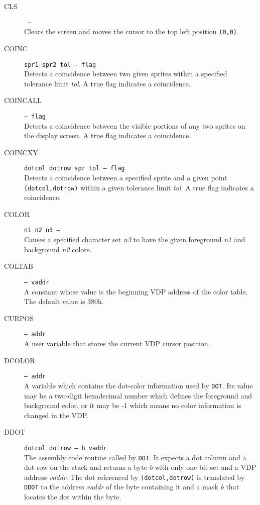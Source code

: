 \documentclass{article}
\begin{document}
\begin{multicols}{2}[]
\begin{description}
			\item[CLS]\texttt{ --- }\\
				Clears the screen and moves the cursor to the top left position \verb|(0,0)|.

			\item[COINC]\texttt{spr1 spr2 tol --- flag }\\
				Detects a coincidence between two given sprites within a specified
				tolerance limit \textit{tol}. A true flag indicates a coincidence.

			\item[COINCALL]\texttt{--- flag }\\
				Detects a coincidence between the visible portions of any two sprites
				on the display screen. A true flag indicates a coincidence.

			\item[COINCXY]\texttt{dotcol dotrow spr tol --- flag }\\
				Detects a coincidence between a specified sprite and a given point
				\verb|(dotcol,dotrow)| within a given tolerance limit \textit{tol}.
				A true flag indicates a coincidence.

			\item[COLOR]\texttt{n1 n2 n3 --- }\\
				Causes a specified character set \textit{n3} to have the given
				foreground \textit{n1} and background \textit{n2} colors.

			\item[COLTAB]\texttt{--- vaddr }\\
				A constant whose value is the beginning VDP address of the color
				table. The default value is 380h.

			\item[CURPOS]\texttt{--- addr }\\
				A user variable that stores the current VDP cursor position.

			\item[DCOLOR]\texttt{--- addr }\\
				A variable which contains the dot-color information used by \verb|DOT|.
				Its value may be a two-digit hexadecimal number which defines the
				foreground and background color, or it may be -1 which means no
				color information is changed in the VDP.

			\item[DDOT]\texttt{dotcol dotrow --- b vaddr }\\
				The assembly code routine called by \verb|DOT|. It expects a dot
				column and a dot row on the stack and returns a byte \textit{b} with
				only one bit set and a VDP address \textit{vaddr}. The dot referenced
				by \verb|(dotcol,dotrow)| is translated by \verb|DDOT| to the address
				\textit{vaddr} of the byte containing it and a mask \textit{b} that
				locates the dot within the byte.


\end{description}
\end{multicols}
\end{document}
